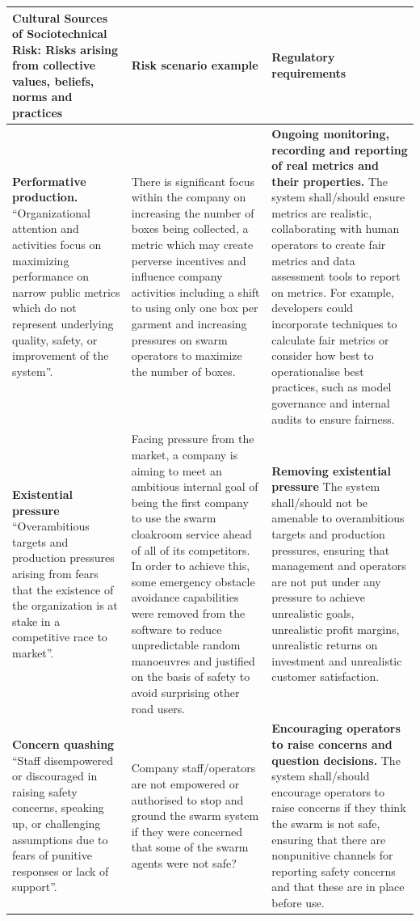 \documentclass[lettersize,journal]{IEEEtran}
\begin{document}
\begin{landscape}
\begin{table}[]
    \centering
    \begin{tabular}{|p{0.3\textheight}|p{0.3\textheight}|p{0.4\textheight}|}
        \hline
        \textbf{Cultural Sources of Sociotechnical Risk:} Risks arising from collective values, beliefs, norms and practices & \textbf{Risk scenario example} & 	\textbf{Regulatory requirements}\\
        \hline
        \textbf{Performative production.} ``Organizational attention and activities focus on maximizing performance on narrow public metrics which do not represent underlying quality, safety, or improvement of the system”. \cite{macrae2021learning} & There is significant focus within the company on increasing the number of boxes being collected, a metric which may create perverse incentives and influence company activities including a shift to using only one box per garment and increasing pressures on swarm operators to maximize the number of boxes. & \textbf{Ongoing monitoring, recording and reporting of real metrics and their properties.} The system shall/should ensure metrics are realistic, collaborating with human operators to create fair metrics and data assessment tools to report on metrics. For example, developers could incorporate techniques to calculate fair metrics or consider how best to operationalise best practices, such as model governance and internal audits to ensure fairness.\\
        \hline
        \textbf{Existential pressure} ``Overambitious targets and production pressures arising from fears that the existence of the organization is at stake in a competitive race to market”. \cite{macrae2021learning} & Facing pressure from the market, a company is aiming to meet an ambitious internal goal of being the first company to use the swarm cloakroom service ahead of all of its competitors. In order to achieve this, some emergency obstacle avoidance capabilities were removed from the software to reduce unpredictable random manoeuvres and justified on the basis of safety to avoid surprising other road users. & \textbf{Removing existential pressure} The system shall/should not be amenable to overambitious targets and production pressures, ensuring that management and operators are not put under any pressure to achieve unrealistic goals, unrealistic profit margins, unrealistic returns on investment and unrealistic customer satisfaction.\\
        \hline
        \textbf{Concern quashing} ``Staff disempowered or discouraged in raising safety concerns, speaking up, or challenging assumptions due to fears of punitive responses or lack of support”. \cite{macrae2021learning} & Company staff/operators are not empowered or authorised to stop and ground the swarm system if they were concerned that some of the swarm agents were not safe? & \textbf{Encouraging operators to raise concerns and question decisions.} The system shall/should encourage operators to raise concerns if they think the swarm is not safe, ensuring that there are nonpunitive channels for reporting safety concerns and that these are in place before use.\\

\end{tabular}
\end{table}
\end{landscape}
\end{document}
